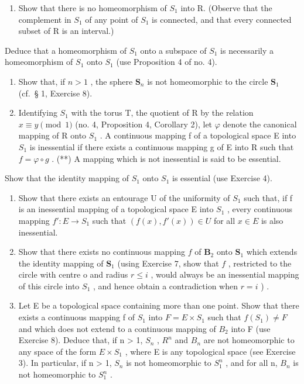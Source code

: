 \begin{enumerate}
\def\labelenumi{\arabic{enumi})}
\setcounter{enumi}{3}
\tightlist
\item
  Show that there is no homeomorphism of \(S_{1}\) into R. (Observe that the complement in \(S_{1}\) of any point of \(S_{1}\) is connected, and that every connected subset of R is an interval.)
\end{enumerate}

Deduce that a homeomorphism of \(S_{1}\) onto a subspace of \(S_{1}\) is necessarily a homeomorphism of \(S_{1}\) onto \(S_{1}\) (use Proposition 4 of no. 4).

\begin{enumerate}
\def\labelenumi{\arabic{enumi})}
\setcounter{enumi}{4}
\item
  Show that, if \(n > 1\) , the sphere \(\mathbf{S}_n\) is not homeomorphic to the circle \(\mathbf{S}_1\) (cf.~§ 1, Exercise 8).
\item
  Identifying \(S_{1}\) with the torus T, the quotient of R by the relation \(x \equiv y \pmod{1}\) (no. 4, Proposition 4, Corollary 2), let \(\varphi\) denote the canonical mapping of R onto \(S_{1}\) . A continuous mapping f of a topological space E into \(S_{1}\) is inessential if there exists a continuous mapping g of E into R such that \(f = \varphi \circ g\) . (**) A mapping which is not inessential is said to be essential.
\end{enumerate}

Show that the identity mapping of \(S_{1}\) onto \(S_{1}\) is essential (use Exercise 4).

\begin{enumerate}
\def\labelenumi{\arabic{enumi})}
\setcounter{enumi}{6}
\item
  Show that there exists an entourage U of the uniformity of \(S_{1}\) such that, if f is an inessential mapping of a topological space E into \(S_{1}\) , every continuous mapping \(f' : E \to S_{1}\) such that \((f(x), f'(x)) \in U\) for all \(x \in E\) is also inessential.
\item
  Show that there exists no continuous mapping \(f\) of \(\mathbf{B}_2\) onto \(\mathbf{S}_1\) which extends the identity mapping of \(\mathbf{S}_1\) (using Exercise 7, show that \(f\) , restricted to the circle with centre o and radius \(r \leqslant i\) , would always be an inessential mapping of this circle into \(S_{1}\) , and hence obtain a contradiction when \(r = i\) ) .
\item
  Let E be a topological space containing more than one point. Show that there exists a continuous mapping f of \(S_{1}\) into \(F = E \times S_{1}\) such that \(f(S_{1}) \neq F\) and which does not extend to a continuous mapping of \(B_{2}\) into F (use Exercise 8). Deduce that, if n \textgreater{} 1, \(S_{n}\) , \(R^{n}\) and \(B_{n}\) are not homeomorphic to any space of the form \(E \times S_{1}\) , where E is any topological space (see Exercise 3). In particular, if n \textgreater{} 1, \(S_{n}\) is not homeomorphic to \(S_{1}^{n}\) , and for all n, \(B_{n}\) is not homeomorphic to \(S_{1}^{n}\) .
\end{enumerate}

